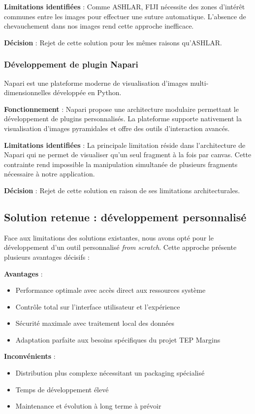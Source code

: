 \documentclass[12pt,a4paper]{report}
\begin{document}
\textbf{Limitations identifiées} : Comme ASHLAR, FIJI nécessite des zones d'intérêt communes entre les images pour effectuer une suture automatique. L'absence de chevauchement dans nos images rend cette approche inefficace.

\textbf{Décision} : Rejet de cette solution pour les mêmes raisons qu'ASHLAR.

\subsubsection{Développement de plugin Napari}

Napari est une plateforme moderne de visualisation d'images multi-dimensionnelles développée en Python.

\textbf{Fonctionnement} : Napari propose une architecture modulaire permettant le développement de plugins personnalisés. La plateforme supporte nativement la visualisation d'images pyramidales et offre des outils d'interaction avancés.

\textbf{Limitations identifiées} : La principale limitation réside dans l'architecture de Napari qui ne permet de visualiser qu'un seul fragment à la fois par canvas. Cette contrainte rend impossible la manipulation simultanée de plusieurs fragments nécessaire à notre application.

\textbf{Décision} : Rejet de cette solution en raison de ses limitations architecturales.

\subsection{Solution retenue : développement personnalisé}

Face aux limitations des solutions existantes, nous avons opté pour le développement d'un outil personnalisé \textit{from scratch}. Cette approche présente plusieurs avantages décisifs :

\textbf{Avantages} :
\begin{itemize}
\item Performance optimale avec accès direct aux ressources système
\item Contrôle total sur l'interface utilisateur et l'expérience
\item Sécurité maximale avec traitement local des données
\item Adaptation parfaite aux besoins spécifiques du projet TEP Margins
\end{itemize}

\textbf{Inconvénients} :
\begin{itemize}
\item Distribution plus complexe nécessitant un packaging spécialisé
\item Temps de développement élevé
\item Maintenance et évolution à long terme à prévoir
\end{itemize}
\end{document}
